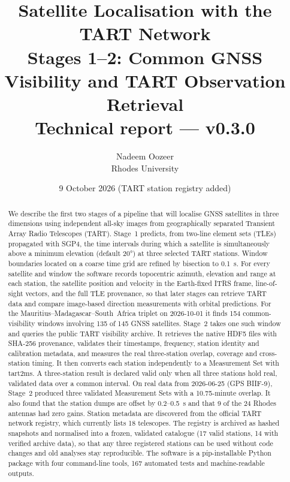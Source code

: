 \documentclass[11pt,a4paper]{article}
\title{\textbf{Satellite Localisation with the TART Network}\\[4pt]
\large Stages 1--2: Common GNSS Visibility and TART Observation Retrieval\\
\normalsize Technical report --- \code{tart\_gnss} v0.3.0}
\author{Nadeem Oozeer\\ Rhodes University}
\date{9 October 2026 (TART station registry added)}
\newcommand{\code}[1]{{\ttfamily\def\_{\textunderscore\allowbreak}#1}}
\begin{document}
\maketitle

\begin{abstract}
We describe the first two stages of a pipeline that will localise GNSS satellites
in three dimensions using independent all-sky images from geographically
separated Transient Array Radio Telescopes (TART). Stage~1 predicts, from
two-line element sets (TLEs) propagated with SGP4, the time intervals during
which a satellite is simultaneously above a minimum elevation (default
\ang{20}) at three selected TART stations. Window boundaries located on a
coarse time grid are refined by bisection to \SI{0.1}{\second}. For every
satellite and window the software records topocentric azimuth, elevation and
range at each station, the satellite position and velocity in the Earth-fixed
ITRS frame, line-of-sight vectors, and the full TLE provenance, so that later
stages can retrieve TART data and compare image-based direction measurements
with orbital predictions. For the Mauritius--Madagascar--South~Africa triplet
on 2026-10-01 it finds 154 common-visibility windows involving 135 of 145 GNSS
satellites. Stage~2 takes one such window and queries the public TART
visibility archive. It retrieves the native HDF5 files with SHA-256
provenance, validates their timestamps, frequency, station identity and
calibration metadata, and measures the real three-station overlap, coverage
and cross-station timing. It then converts each station independently to a
Measurement Set with \code{tart2ms}. A three-station result is declared
valid only when all three stations hold real, validated data over a common
interval. On real data from 2026-06-25 (GPS BIIF-9), Stage~2 produced three
validated Measurement Sets with a 10.75-minute overlap. It also found that
the station dumps are offset by 0.2--0.5~s and that 9 of the 24 Rhodes
antennas had zero gains. Station metadata are discovered from the official
TART network registry, which currently lists 18 telescopes. The registry is
archived as hashed snapshots and normalised into a frozen, validated catalogue
(17 valid stations, 14 with verified archive data), so that any three
registered stations can be used without code changes and old analyses stay
reproducible. The software is a pip-installable Python package with four
command-line tools, 167 automated tests and machine-readable outputs.
\end{abstract}
\end{document}
